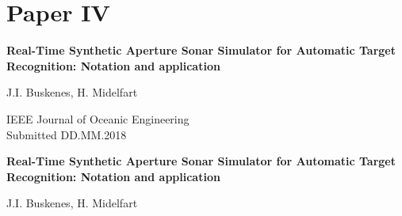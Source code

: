 
\endofdump



\ifRootBuild\else
  
  \makeglossaries
  
  
\fi

\newif\ifBuildBibliography\BuildBibliographyfalse

{}


\renewcommand\includegraphics[2][]{%
  \immediate\write18{../Simulator/bin/laFigure #2 #1}%
  }%




\graphicspath{{../Simulator/}}

% 
\cleardoublepage
\pagestyle{empty}

{
\setlength\parskip{\baselineskip}
\renewcommand\baselinestretch{1.1}

\chapter{Paper IV}\label{ch:paperIV}

{\Large\bf Real-Time Synthetic Aperture Sonar Simulator for Automatic Target Recognition: Notation and application}

J.I. Buskenes, H. Midelfart

IEEE Journal of Oceanic Engineering\\
Submitted DD.MM.2018%
}

\cleardoublepage
\pagestyle{normal}
\thispagestyle{plain}

\begin{center}
{\Large\bf Real-Time Synthetic Aperture Sonar Simulator for Automatic Target Recognition: Notation and application}

\vspace{\baselineskip}
J.I. Buskenes, H. Midelfart
\end{center}

\overfullrule=1mm
{

   
}
   
   
% 
% 
%    


